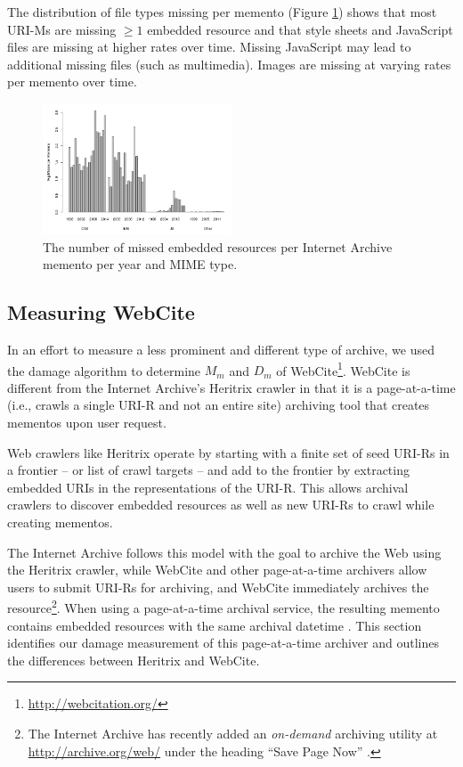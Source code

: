 The distribution of file types missing per memento (Figure \ref{occstats}) shows that most URI-Ms are missing $\ge 1$ embedded resource and that style sheets and JavaScript files are missing at higher rates over time. Missing JavaScript may lead to additional missing files (such as multimedia). Images are missing at varying rates per memento over time.

\begin{figure}[h!]
\includegraphics[width=0.5\textwidth]{./imgs/fileTypes.png}
\caption{The number of missed embedded resources per Internet Archive memento per year and MIME type.
}
\label{occstats}
\end{figure}



\subsection{Measuring WebCite}
\label{webcite}

In an effort to measure a less prominent and different type of archive, we used the damage algorithm to determine $M_m$ and $D_m$ of WebCite\footnote{\url{http://webcitation.org/}}\cite{webcite}. WebCite is different from the Internet Archive's Heritrix crawler in that it is a page-at-a-time (i.e., crawls a single URI-R and not an entire site) archiving tool that creates mementos upon user request. 

Web crawlers like Heritrix operate by starting with a finite set of seed URI-Rs in a frontier -- or list of crawl targets -- and add to the frontier by extracting embedded URIs in the representations of the URI-R. This allows archival crawlers to discover embedded resources as well as new URI-Rs to crawl while creating mementos. 

The Internet Archive follows this model with the goal to archive the Web using the Heritrix crawler, while WebCite and other page-at-a-time archivers allow users to submit URI-Rs for archiving, and WebCite immediately archives the resource\footnote{The Internet Archive has recently added an \emph{on-demand} archiving utility at \url{http://archive.org/web/} under the heading ``Save Page Now'' \cite{savePage}.}. When using a page-at-a-time archival service, the resulting memento contains embedded resources with the same archival datetime \cite{temporalCoherence}. This section identifies our damage measurement of this page-at-a-time archiver and outlines the differences between Heritrix and WebCite. 

